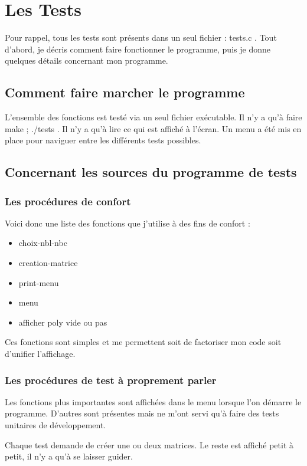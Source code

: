 \chapter{Les Tests}

Pour rappel, tous les tests sont présents dans un seul fichier : tests.c .
Tout d'abord, je décris comment faire fonctionner le programme, puis je donne quelques détails concernant mon programme.

\section{Comment faire marcher le programme}

L'ensemble des fonctions est testé via un seul fichier exécutable. Il n'y a qu'à faire make ; ./tests .
Il n'y a qu'à lire ce qui est affiché à l'écran.
Un menu a été mis en place pour naviguer entre les différents tests possibles.

\section{Concernant les sources du programme de tests}
\subsection{Les procédures de confort}

Voici donc une liste des fonctions que j'utilise à des fins de confort : 
\begin{itemize}
	\item choix-nbl-nbc
	\item creation-matrice
	\item print-menu
	\item menu
	\item afficher poly vide ou pas
\end{itemize}

Ces fonctions sont simples et me permettent soit de factoriser mon code soit d'unifier l'affichage.

\subsection{Les procédures de test à proprement parler}
Les fonctions plus importantes sont affichées dans le menu lorsque l'on démarre le programme.
D'autres sont présentes mais ne m'ont servi qu'à faire des tests unitaires de développement.

Chaque test demande de créer une ou deux matrices. 
Le reste est affiché petit à petit, il n'y a qu'à se laisser guider.

